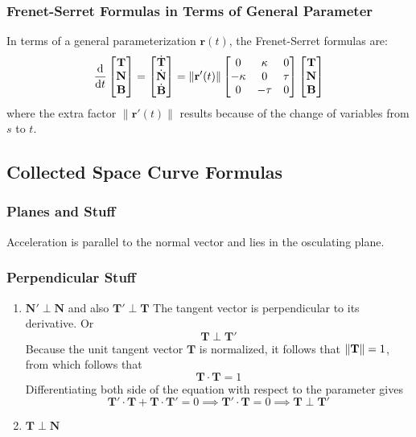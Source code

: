 \documentclass[11pt, a4paper]{article}
\begin{document}
\subsubsection{Frenet-Serret Formulas in Terms of General Parameter}
In terms of a general parameterization $ \bm{r}(t) $, the Frenet-Serret formulas are:
\[ \dv{}{t} 
\begin{bmatrix}
	\mathbf{T}\\
	\mathbf{N}\\
	\mathbf{B}
\end{bmatrix}
= 
\begin{bmatrix}
	\dot{\mathbf{T}}\\
	\dot{\mathbf{N}}\\
	\dot{\mathbf{B}}
\end{bmatrix}
=
\|\mathbf{r}'(t)\|
\begin{bmatrix}
	0&\kappa&0\\
	-\kappa&0&\tau\\
	0&-\tau&0
\end{bmatrix}
\begin{bmatrix}
	\mathbf{T}\\
	\mathbf{N}\\
	\mathbf{B}
\end{bmatrix}	\]
where the extra factor $ \|\mathbf{r}'(t)\| $ results because of the change of variables from $ s $ to $ t $. 


\iffalse
\subsection{Collected Space Curve Formulas}

\subsubsection{Planes and Stuff}
Acceleration is parallel to the normal vector and lies in the osculating plane.

\subsubsection{Perpendicular Stuff}
\begin{enumerate}
	\item $ \mathbf{N}' \perp \mathbf{N} $ and also $  \mathbf{T}' \perp \mathbf{T} $
 The tangent vector is perpendicular to its derivative. Or
	\begin{equation*}
		\mathbf{T} \perp \mathbf{T}'
	\end{equation*}
	Because the unit tangent vector $ \mathbf{T} $ is normalized, it follows that $ \norm{\mathbf{T}} = 1 $, from which follows that 
	\begin{equation*}
\mathbf{T} \cdot \mathbf{T} = 1
	\end{equation*}
	Differentiating both side of the equation with respect to the parameter gives 
	\begin{equation*}
 		\mathbf{T}' \cdot \mathbf{T} + \mathbf{T} \cdot \mathbf{T}' = 0 \implies \mathbf{T}' \cdot \mathbf{T} = 0 \implies 	\mathbf{T} \perp \mathbf{T}'
	\end{equation*}
	\item $ \mathbf{T} \perp \mathbf{N}$
\end{enumerate}
\end{document}
